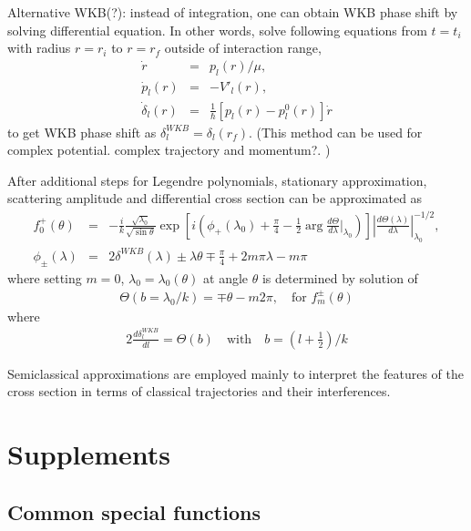 \documentclass[10pt]{book}
\newcommand{\bea}{\begin{eqnarray}}
\newcommand{\eea}{\end{eqnarray}}
\newcommand{\no}{\nonumber \\}
\begin{document}
Alternative WKB(?): instead of integration, one can obtain WKB phase shift by solving differential equation. In other words, solve following equations from $t=t_i$ with radius $r=r_i$
to $r=r_f$ outside of interaction range, 
\bea 
\dot{r} &=& p_l(r)/\mu,\no 
\dot{p}_l(r) &=& - V'_l(r),\no 
\dot{\delta}_l(r)&=&\frac{1}{\hbar}[p_l(r)-p_l^0(r)] \dot{r} 
\eea 
to get WKB phase shift as $\delta_l^{WKB} = \delta_l(r_f)$.
(This method can be used for complex potential. complex trajectory and momentum?. )

After additional steps for Legendre polynomials, stationary approximation, 
scattering amplitude and differential cross section can be approximated as
\bea 
f^+_0(\theta)&=& -\frac{i}{k}\frac{\sqrt{\lambda_0}}{\sqrt{\sin\theta}}
               \exp\left[i\left(\phi_+(\lambda_0)+\frac{\pi}{4}-\frac{1}{2}\arg \frac{d\Theta}{d\lambda}|_{\lambda_0} \right)    \right]
               |\frac{d\Theta(\lambda)}{d\lambda}|^{-1/2}_{\lambda_0},\no 
\phi_\pm(\lambda)&=&2\delta^{WKB}(\lambda)\pm\lambda\theta\mp\frac{\pi}{4}+2m\pi\lambda-m\pi               
\eea 
where setting $m=0$, $\lambda_0=\lambda_0(\theta)$ at angle $\theta$
is determined by solution of 
\bea 
\Theta(b=\lambda_0/k)=\mp\theta-m2\pi,\quad \mbox{for } f_m^\pm(\theta)
\eea 
where
\bea 
2\frac{d\delta_l^{WKB}}{dl}=\Theta(b) \quad \mbox{with} \quad b=(l+\frac{1}{2})/k
\eea 

Semiclassical approximations are employed mainly to interpret the features
of the cross section in terms of classical trajectories and their interferences. 
\chapter{Supplements}

\section{Common special functions}
\end{document}
